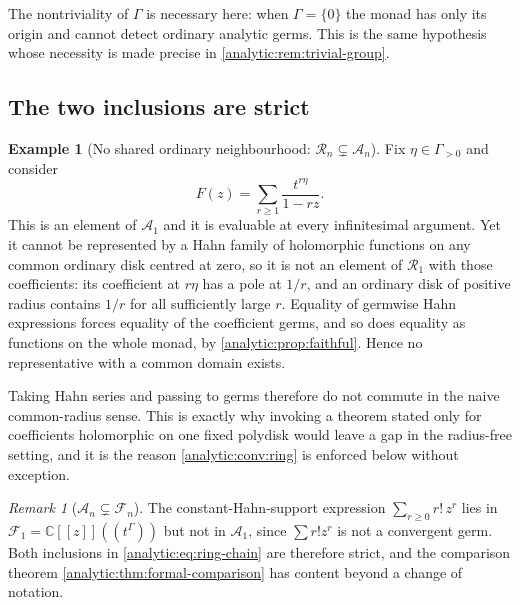 \documentclass[11pt,letterpaper]{article}
\theoremstyle{definition}
\newtheorem{example}[theorem]{Example}
\theoremstyle{remark}
\newtheorem{remark}[theorem]{Remark}
\newcommand{\C}{\mathbb C}
\newcommand{\A}{\mathscr A}
\newcommand{\RR}{\mathscr R}
\newcommand{\FF}{\mathscr F}
\numberwithin{equation}{section}
\begin{document}
The nontriviality of $\Gamma$ is necessary here: when $\Gamma=\{0\}$ the
monad has only its origin and cannot detect ordinary analytic germs. This
is the same hypothesis whose necessity is made precise in
\cref{analytic:rem:trivial-group}.

\subsection{The two inclusions are strict}
\label{analytic:subsec:strictness}
\begin{example}[No shared ordinary neighbourhood: $\RR_n\subsetneq\A_n$]
\label{analytic:ex:no-radius}
Fix $\eta\in\Gamma_{>0}$ and consider
\begin{equation}\label{analytic:eq:no-radius}
 F(z)=\sum_{r\ge1}\frac{t^{r\eta}}{1-rz}.
\end{equation}
This is an element of $\A_1$ and it is evaluable at every infinitesimal
argument. Yet it cannot be represented by a Hahn family of holomorphic
functions on any common ordinary disk centred at zero, so it is not an
element of $\RR_1$ with those coefficients: its coefficient at $r\eta$ has a
pole at $1/r$, and an ordinary disk of positive radius contains $1/r$ for
all sufficiently large $r$. Equality of germwise Hahn expressions forces
equality of the coefficient germs, and so does equality as functions on the
whole monad, by \cref{analytic:prop:faithful}. Hence no representative with
a common domain exists.
\end{example}

Taking Hahn series and passing to germs therefore do not commute in the
naive common-radius sense. This is exactly why invoking a theorem stated
only for coefficients holomorphic on one fixed polydisk would leave a gap in
the radius-free setting, and it is the reason
\cref{analytic:conv:ring} is enforced below without exception.

\begin{remark}[$\A_n\subsetneq\FF_n$]\label{analytic:rem:formal-strict}
The constant-Hahn-support expression $\sum_{r\ge0}r!\,z^r$ lies in
$\FF_1=\C[[z]]((t^\Gamma))$ but not in $\A_1$, since $\sum r!z^r$ is not a
convergent germ. Both inclusions in
\eqref{analytic:eq:ring-chain} are therefore strict, and the comparison
theorem \cref{analytic:thm:formal-comparison} has content beyond a change
of notation.
\end{remark}
\end{document}

